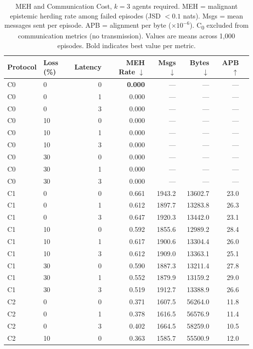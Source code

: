\documentclass[pdflatex,sn-mathphys-num]{sn-jnl}%
\theoremstyle{thmstyleone}%
\theoremstyle{thmstyletwo}%
\theoremstyle{thmstylethree}%
\begin{document}
\begin{appendices}
\begin{table}
\centering
\caption{MEH and Communication Cost, $k=3$ agents required. MEH = malignant epistemic herding rate among failed episodes (JSD $< 0.1$ nats). Msgs = mean messages sent per episode. APB = alignment per byte ($\times 10^{-6}$). C\textsubscript{0} excluded from communication metrics (no transmission). Values are means across 1,000 episodes. Bold indicates best value per metric.}
\label{tab:appendix_cost_b}
\small
\begin{tabular}{llrrrrrr}
\toprule
Protocol & Loss (\%) & Latency & MEH Rate $\downarrow$ & Msgs $\downarrow$ & Bytes $\downarrow$ & APB $\uparrow$ \\
\midrule
C0 & 0 & 0 & \textbf{0.000} & --- & --- & --- \\
C0 & 0 & 1 & 0.000 & --- & --- & --- \\
C0 & 0 & 3 & 0.000 & --- & --- & --- \\
C0 & 10 & 0 & 0.000 & --- & --- & --- \\
C0 & 10 & 1 & 0.000 & --- & --- & --- \\
C0 & 10 & 3 & 0.000 & --- & --- & --- \\
C0 & 30 & 0 & 0.000 & --- & --- & --- \\
C0 & 30 & 1 & 0.000 & --- & --- & --- \\
C0 & 30 & 3 & 0.000 & --- & --- & --- \\
\addlinespace[4pt]
C1 & 0 & 0 & 0.661 & 1943.2 & 13602.7 & 23.0 \\
C1 & 0 & 1 & 0.612 & 1897.7 & 13283.8 & 26.3 \\
C1 & 0 & 3 & 0.647 & 1920.3 & 13442.0 & 23.1 \\
C1 & 10 & 0 & 0.592 & 1855.6 & 12989.2 & 28.4 \\
C1 & 10 & 1 & 0.617 & 1900.6 & 13304.4 & 26.0 \\
C1 & 10 & 3 & 0.612 & 1909.0 & 13363.1 & 25.1 \\
C1 & 30 & 0 & 0.590 & 1887.3 & 13211.4 & 27.8 \\
C1 & 30 & 1 & 0.552 & 1879.9 & 13159.2 & 29.0 \\
C1 & 30 & 3 & 0.519 & 1912.7 & 13388.9 & 26.6 \\
\addlinespace[4pt]
C2 & 0 & 0 & 0.371 & 1607.5 & 56264.0 & 11.8 \\
C2 & 0 & 1 & 0.378 & 1616.5 & 56576.9 & 11.4 \\
C2 & 0 & 3 & 0.402 & 1664.5 & 58259.0 & 10.5 \\
C2 & 10 & 0 & 0.363 & 1585.7 & 55500.9 & 12.0 \\

\end{tabular}
\end{table}
\end{appendices}
\end{document}
